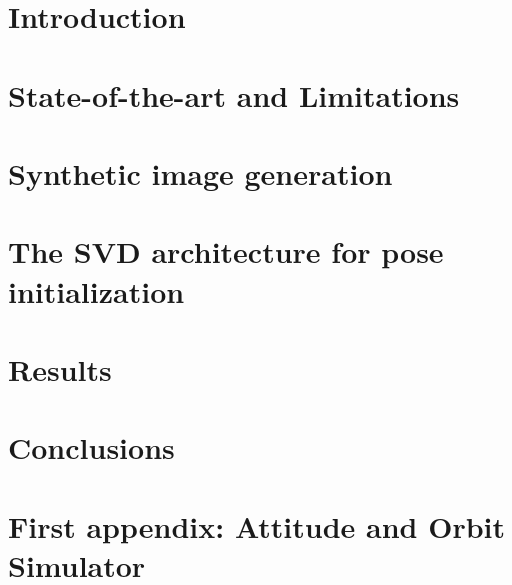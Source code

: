 \documentclass[a4paper,twoside,12pt]{book}
\begin{document}
\clearpage
\printnoidxglossary[type=\acronymtype,title=Abbreviated Terms]

\chapter*{Introduction\label{chap:introduction}}

\cleardoublepage{}

\chapter{State-of-the-art and Limitations\label{chap:first-chapter}}

\cleardoublepage{}
\chapter{Synthetic image generation\label{chap:second-chapter}}

\cleardoublepage{}
\chapter{The SVD architecture for pose initialization\label{chap:third-chapter}}

\cleardoublepage{}
\chapter{Results\label{chap:fourth-chapter}}

\cleardoublepage{}

\chapter*{Conclusions}

\cleardoublepage{}



\cleardoublepage{}

\appendix
\chapter{First appendix: Attitude and Orbit Simulator \label{app:first-appendix}}

\cleardoublepage{}

\end{document}
